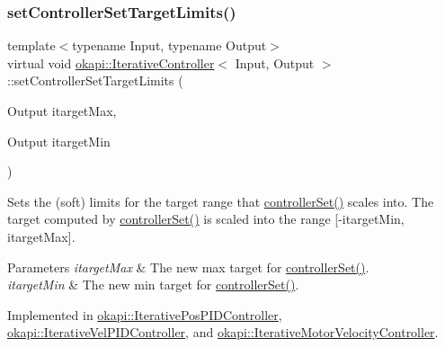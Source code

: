 \subsubsection{\texorpdfstring{setControllerSetTargetLimits()}{setControllerSetTargetLimits()}}
{\footnotesize\ttfamily template$<$typename Input, typename Output$>$ \\
virtual void \mbox{\hyperlink{classokapi_1_1IterativeController}{okapi\+::\+Iterative\+Controller}}$<$ Input, Output $>$\+::set\+Controller\+Set\+Target\+Limits (\begin{DoxyParamCaption}\item[{Output}]{itarget\+Max,  }\item[{Output}]{itarget\+Min }\end{DoxyParamCaption})\hspace{0.3cm}{\ttfamily [pure virtual]}}

Sets the (soft) limits for the target range that \mbox{\hyperlink{classokapi_1_1ControllerOutput_a360c08f0c10b36f882d6d3100c2cad49}{controller\+Set()}} scales into. The target computed by {\ttfamily \mbox{\hyperlink{classokapi_1_1ControllerOutput_a360c08f0c10b36f882d6d3100c2cad49}{controller\+Set()}}} is scaled into the range {\ttfamily \mbox{[}-\/itarget\+Min, itarget\+Max\mbox{]}}.


\begin{DoxyParams}{Parameters}
{\em itarget\+Max} & The new max target for \mbox{\hyperlink{classokapi_1_1ControllerOutput_a360c08f0c10b36f882d6d3100c2cad49}{controller\+Set()}}. \\
\hline
{\em itarget\+Min} & The new min target for \mbox{\hyperlink{classokapi_1_1ControllerOutput_a360c08f0c10b36f882d6d3100c2cad49}{controller\+Set()}}. \\
\hline
\end{DoxyParams}


Implemented in \mbox{\hyperlink{classokapi_1_1IterativePosPIDController_a556937096c9a1331e705a8fa9175c884}{okapi\+::\+Iterative\+Pos\+P\+I\+D\+Controller}}, \mbox{\hyperlink{classokapi_1_1IterativeVelPIDController_a054d5bff10ba504b9f72db567ad45bfb}{okapi\+::\+Iterative\+Vel\+P\+I\+D\+Controller}}, and \mbox{\hyperlink{classokapi_1_1IterativeMotorVelocityController_a083db063a4f8f15787a0c97068eef755}{okapi\+::\+Iterative\+Motor\+Velocity\+Controller}}.

\mbox{\label{classokapi_1_1IterativeController_ae1a7d9bd29d176a26bcc70c741f0d50f}} 
